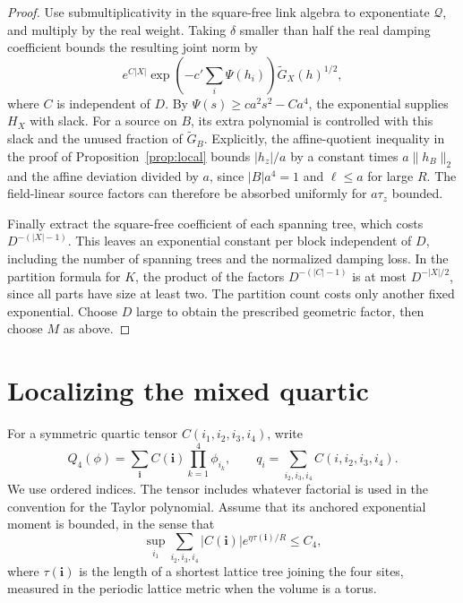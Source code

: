 \documentclass[11pt]{article}
\begin{document}
\begin{proof}
Use submultiplicativity in the square-free link algebra to
exponentiate \(\mathcal Q\), and multiply by the real weight.
Taking \(\delta\) smaller than half the real damping coefficient
bounds the resulting joint norm by
\[
 e^{C|X|}\exp\left(-c'\sum_i\Psi(h_i)\right)
                  \widetilde G_X(h)^{1/2},
\]
where \(C\) is independent of \(D\). By
\(\Psi(s)\ge c a^2 s^2-Ca^4\), the exponential supplies
\(H_X\) with slack. For a source on \(B\), its extra polynomial
is controlled with this slack and the unused fraction of
\(\widetilde G_B\). Explicitly, the affine-quotient inequality
in the proof of Proposition~\ref{prop:local} bounds \(|h_z|/a\)
by a constant times \(a\|h_B\|_2\) and the affine deviation divided
by \(a\), since \(|B|a^4=1\) and \(\ell\le a\) for large \(R\).
The field-linear source factors can therefore be absorbed uniformly
for \(a\tau_z\) bounded.

Finally extract the square-free coefficient of each spanning tree,
which costs \(D^{-(|X|-1)}\). This leaves an exponential constant
per block independent of \(D\), including the number of spanning
trees and the normalized damping loss. In the partition formula
for \(K\), the product of the factors \(D^{-(|C|-1)}\) is at
most \(D^{-|X|/2}\), since all parts have size at least two.
The partition count costs only another fixed exponential.
Choose \(D\) large to obtain the prescribed geometric factor,
then choose \(M\) as above.
\end{proof}


\section{Localizing the mixed quartic}

For a symmetric quartic tensor \(C(i_1,i_2,i_3,i_4)\), write
\[
 Q_4(\phi)=\sum_{\boldsymbol i}C(\boldsymbol i)\prod_{k=1}^4\phi_{i_k},
 \qquad q_i=\sum_{i_2,i_3,i_4}C(i,i_2,i_3,i_4).
\]
We use ordered indices. The tensor includes whatever factorial
is used in the convention for the Taylor polynomial. Assume that
its anchored exponential moment is bounded, in the sense that
\begin{equation}\label{eq:quartic-tensor-local}
 \sup_{i_1}\sum_{i_2,i_3,i_4}|C(\boldsymbol i)|
           e^{\eta\tau(\boldsymbol i)/R}\le C_4,
\end{equation}
where \(\tau(\boldsymbol i)\) is the length of a shortest lattice
tree joining the four sites, measured in the periodic lattice metric
when the volume is a torus.
\end{document}

